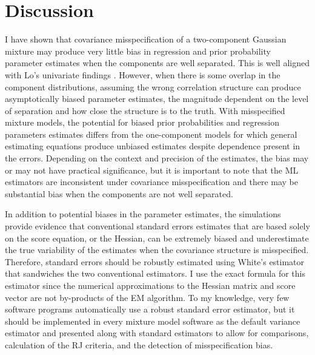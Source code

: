 \section{Discussion}\label{chp2:sec:disc}
I have shown that covariance misspecification of a two-component Gaussian mixture may produce very little bias in regression and prior probability parameter estimates when the components are well separated. This is well aligned with Lo's univariate findings \cite{lo2011}. However, when there is some overlap in the component distributions, assuming the wrong correlation structure can produce asymptotically biased parameter estimates, the magnitude dependent on the level of separation and how close the structure is to the truth. With misspecified mixture models, the potential for biased prior probabilities and regression parameters estimates differs from the one-component models for which general estimating equations \cite{liang1986} produce unbiased estimates despite dependence present in the errors. Depending on the context and precision of the estimates, the bias may or may not have practical significance, but it is important to note that the ML estimators are inconsistent under covariance misspecification and there may be substantial bias when the components are not well separated.

In addition to potential biases in the parameter estimates, the simulations provide evidence that conventional standard errors estimates that are based solely on the score equation, or the Hessian, can be extremely biased and underestimate the true variability of the estimates when the covariance structure is misspecified. Therefore, standard errors should be robustly estimated using White's estimator that sandwiches the two conventional estimators. I use the exact formula for this estimator since the numerical approximations to the Hessian matrix and score vector are not by-products of the EM algorithm. To my knowledge, very few software programs automatically use a robust standard error estimator, but it should be implemented in every mixture model software as the default variance estimator and presented along with standard estimators to allow for comparisons, calculation of the RJ criteria, and the detection of misspecification bias. 

